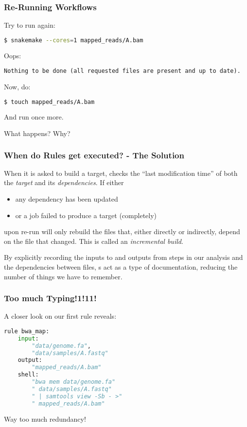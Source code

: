 \begin{frame}[fragile]
  \frametitle{Re-Running Workflows}
  Try to run \Snakemake{} again:
  \begin{lstlisting}[language=Bash, style=Shell]
$ snakemake --cores=1 mapped_reads/A.bam
  \end{lstlisting}
  \pause
  Oops:
  \begin{lstlisting}[style=Plain, basicstyle=\footnotesize]
Nothing to be done (all requested files are present and up to date).
  \end{lstlisting}
  \pause
  Now, do:
  \begin{lstlisting}[language=Bash, style=Shell]
$ touch mapped_reads/A.bam
  \end{lstlisting}
  And run \Snakemake{} once more.
  \begin{question}
  	What happens? Why?
  \end{question}
\end{frame}

\begin{frame}
  \frametitle{When do Rules get executed? - The Solution}
  When it is asked to build a target, \Snakemake{} checks the “last modification time” of both the \emph{target} and its \emph{dependencies}.
  If either
  \begin{itemize}
   \item any dependency has been updated
   \item or a job failed to produce a target (completely)
  \end{itemize}
  upon re-run \Snakemake{} will only rebuild the files that, either directly or indirectly, depend on the file that changed. This is called an \emph{incremental build}.
  \pause
  \begin{docs}
  	By explicitly recording the inputs to and outputs from steps in our analysis and the dependencies between files, s act as a type of documentation, reducing the number of things we have to remember.
  \end{docs}
\end{frame}

\begin{frame}[fragile]
  \frametitle{Too much Typing!1!11!}
  A closer look on our first rule reveals:
  \begin{lstlisting}[language=Python,style=Python]
rule bwa_map:
    input:
        "data/genome.fa",
        "data/samples/A.fastq"
    output:
        "mapped_reads/A.bam"
    shell:
        "bwa mem data/genome.fa"
        " data/samples/A.fastq"
        " | samtools view -Sb - >"
        " mapped_reads/A.bam"
    \end{lstlisting}
    \bcattention Way too much redundancy!
\end{frame}

